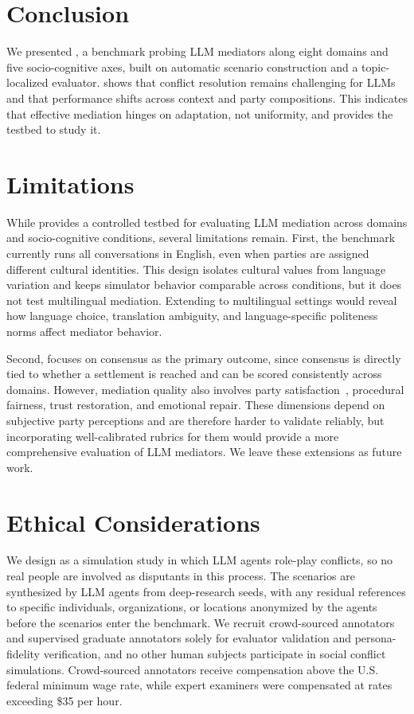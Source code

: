 
\section{Conclusion}
\label{sec:conclusion}

We presented \algname{}, a benchmark probing LLM mediators along eight domains and five socio-cognitive axes, built on automatic scenario construction and a topic-localized evaluator. \algname{} shows that conflict resolution remains challenging for LLMs and that performance shifts across context and party compositions. This indicates that effective mediation hinges on adaptation, not uniformity, and \algname{} provides the testbed to study it.




\section*{Limitations}

While \algname{} provides a controlled testbed for evaluating LLM mediation across domains and socio-cognitive conditions, several limitations remain. First, the benchmark currently runs all conversations in English, even when parties are assigned different cultural identities. This design isolates cultural values from language variation and keeps simulator behavior comparable across conditions, but it does not test multilingual mediation. Extending \algname{} to multilingual settings would reveal how language choice, translation ambiguity, and language-specific politeness norms affect mediator behavior.

Second, \algname{} focuses on consensus as the primary outcome, since consensus is directly tied to whether a settlement is reached and can be scored consistently across domains. However, mediation quality also involves party satisfaction~\citep{hale2025kodis}, procedural fairness, trust restoration, and emotional repair. These dimensions depend on subjective party perceptions and are therefore harder to validate reliably, but incorporating well-calibrated rubrics for them would provide a more comprehensive evaluation of LLM mediators. We leave these extensions as future work.


\section*{Ethical Considerations}

We design \algname{} as a simulation study in which LLM agents role-play conflicts, so no real people are involved as disputants in this process. The scenarios are synthesized by LLM agents from deep-research seeds, with any residual references to specific individuals, organizations, or locations anonymized by the agents before the scenarios enter the benchmark.
%
We recruit crowd-sourced annotators and supervised graduate annotators solely for evaluator validation and persona-fidelity verification, and no other human subjects participate in social conflict simulations. Crowd-sourced annotators receive compensation above the U.S. federal minimum wage
rate, while expert examiners were compensated at
rates exceeding \$35 per hour.

